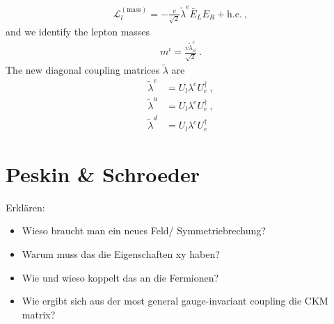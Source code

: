 \begin{align}
	\mathcal{L}_l^{(\text{mass})} = -\frac{v}{\sqrt{2}}\tilde{\lambda}^e \bar{E}_L E_R + \text{h.c.} \ ,
\end{align}
and we identify the lepton masses
\begin{align}
	m^i = \frac{v\tilde{\lambda}^e_{ii}}{\sqrt{2}} \ .
\end{align}
The new diagonal coupling matrices $\tilde{\lambda}$ are
\begin{align}
	\tilde{\lambda}^e &= U_l\lambda^eU_e^\dagger \ , \\
	\tilde{\lambda}^u &= U_l\lambda^eU_e^\dagger \ , \\
	\tilde{\lambda}^d &= U_l\lambda^eU_e^\dagger
\end{align}



\section{Peskin \& Schroeder}
Erklären:
\begin{itemize}
	\item Wieso braucht man ein neues Feld/ Symmetriebrechung?
	\item Warum muss das die Eigenschaften xy haben?
	\item Wie und wieso koppelt das an die Fermionen?
	\item Wie ergibt sich aus der most general gauge-invariant coupling die CKM matrix?
\end{itemize}
